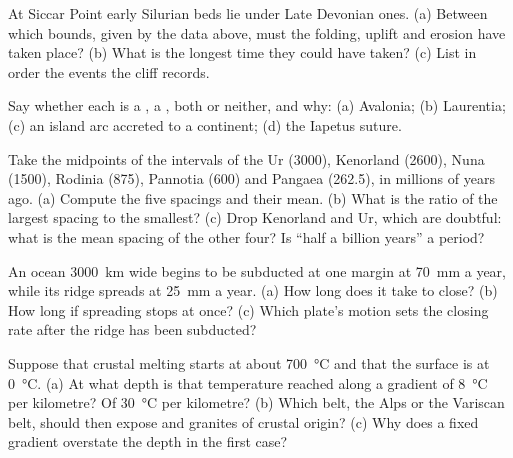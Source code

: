 \begin{exercise}[$\star$]\label{exo:b2:wilson-cycle:3}
At Siccar Point early Silurian beds lie under Late Devonian ones. (a) Between which bounds,
given by the data above, must the folding, uplift and erosion have taken place? (b) What is
the longest time they could have taken? (c) List in order the events the cliff records.
\end{exercise}

\begin{exercise}[$\star$]\label{exo:b2:wilson-cycle:4}
Say whether each is a , a , both or neither, and why: (a) Avalonia;
(b) Laurentia; (c) an island arc accreted to a continent; (d) the Iapetus suture.
\end{exercise}

\begin{exercise}[$\star\star$]\label{exo:b2:wilson-cycle:5}
Take the midpoints of the intervals of the  Ur (3000), Kenorland (2600),
Nuna (1500), Rodinia (875), Pannotia (600) and Pangaea (262.5), in millions of years ago.
(a) Compute the five spacings and their mean. (b) What is the ratio of the largest spacing to
the smallest? (c) Drop Kenorland and Ur, which are doubtful: what is the mean spacing of the
other four? Is ``half a billion years'' a period?
\end{exercise}

\begin{exercise}[$\star\star$]\label{exo:b2:wilson-cycle:6}
An ocean \qty{3000}{km} wide begins to be subducted at one margin at \qty{70}{mm} a year,
while its ridge spreads at \qty{25}{mm} a year. (a) How long does it take to close?
(b) How long if spreading stops at once? (c) Which plate's motion sets the closing rate after
the ridge has been subducted?
\end{exercise}

\begin{exercise}[$\star\star$]\label{exo:b2:wilson-cycle:7}
Suppose that crustal melting starts at about \qty{700}{\celsius} and that the surface is at
\qty{0}{\celsius}. (a) At what depth is that temperature reached along a gradient of
\qty{8}{\celsius} per kilometre? Of \qty{30}{\celsius} per kilometre? (b) Which belt, the
Alps or the Variscan belt, should then expose  and granites of crustal origin?
(c) Why does a fixed gradient overstate the depth in the first case?
\end{exercise}


